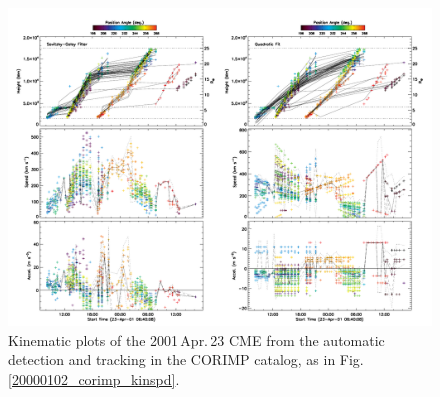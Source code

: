 \documentclass[referee,a4paper,12pt,traditabstract]{swsc}
\begin{document}
\begin{figure}[t]
\centerline{\includegraphics[width=\linewidth]{20010423_corimp_kinspd.pdf}}
\caption{Kinematic plots of the 2001\,Apr.\,23 CME from the automatic detection and tracking in the CORIMP catalog, as in Fig.\,\ref{20000102_corimp_kinspd}.}
\label{20010423_corimp_kinspd}
\end{figure}
\end{document}
